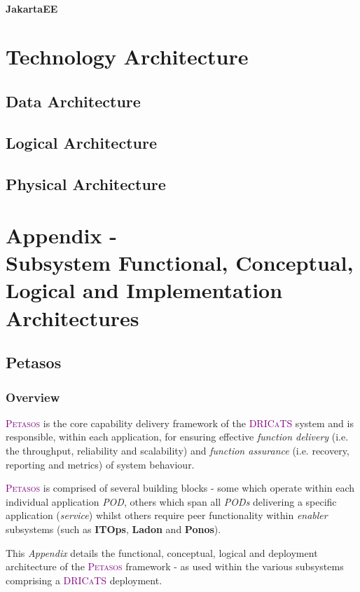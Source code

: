 \documentclass[a4paper]{book}
\newcommand{\dricats}{\textsc{\textcolor{Purple}{\small{DRICaTS }}}}
\newcommand{\petasos}{\textsc{\textcolor{Purple}{\small{Petasos }}}}
\begin{document}
\subsection{JakartaEE\texttrademark}

\part{Technology Architecture}
\chapter{Data Architecture}

\chapter{Logical Architecture}

\chapter{Physical Architecture}

\appendix

\part{Appendix - \\ Subsystem Functional, Conceptual, Logical and Implementation Architectures}
\chapter{Petasos}
\label{epic:petasos}
\section{Overview}
    \petasos is the core capability delivery framework of the \dricats system and is responsible, within each application, for ensuring effective \textit{function delivery} (i.e. the throughput, reliability and scalability) and \textit{function assurance} (i.e. recovery, reporting and metrics) of system behaviour.

    \petasos is comprised of several building blocks - some which operate within each individual application \textit{POD}, others which span all \textit{PODs} delivering a specific application (\textit{service}) whilst others require peer functionality within \textit{enabler} subsystems (such as \textbf{ITOps}, \textbf{Ladon} and \textbf{Ponos}).

    This \textit{Appendix} details the functional, conceptual, logical and deployment architecture of the \petasos framework - as used within the various subsystems comprising a \dricats deployment.
\end{document}

